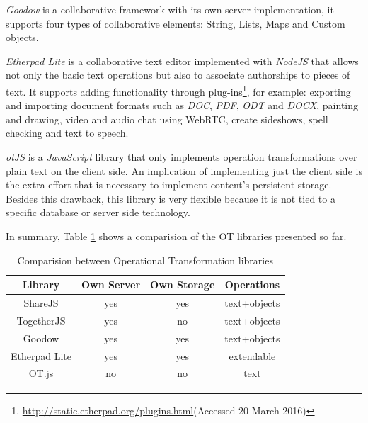 	\emph{Goodow} is a collaborative framework with its own server implementation, it supports four types of collaborative elements: String, Lists, Maps and Custom objects.
	

	\emph{Etherpad Lite} is a collaborative text editor implemented with \emph{NodeJS} that allows not only the basic text operations but also to associate authorships to pieces of text. It supports adding functionality through plug-ins\footnote{\url{http://static.etherpad.org/plugins.html}(Accessed 20 March 2016)}, for example: exporting and importing document formats such as \emph{DOC}, \emph{PDF}, \emph{ODT} and \emph{DOCX}, painting and drawing, video and audio chat using WebRTC, create sideshows, spell checking and text to speech.
	


	\emph{otJS} is a \emph{JavaScript} library that only implements operation transformations over plain text on the client side. An implication of implementing just the client side is the extra effort that is necessary to implement content's persistent storage. Besides this drawback, this library is very flexible because it is not tied to a specific database or server side technology.
	

	In summary, Table \ref{table:otcomparision} shows a comparision of the \ac{OT} libraries presented so far.

\begin{table}
\centering
\caption{Comparision between Operational Transformation libraries}
\label{table:otcomparision}
\begin{tabular}{|c|c|c|c|}
\hline
\textbf{Library} & \textbf{Own Server} & \textbf{Own Storage} & \textbf{Operations} \\ \hline
ShareJS          & yes                 & yes                  & text+objects        \\ \hline
TogetherJS       & yes                 & no                   & text+objects        \\ \hline
Goodow           & yes                 & yes                  & text+objects        \\ \hline
Etherpad Lite    & yes                 & yes                  & extendable 			    \\ \hline
OT.js            & no                  & no                   & text                \\ \hline
\end{tabular}
\end{table}


